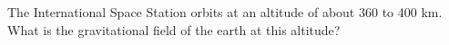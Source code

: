         The International Space Station orbits at an altitude of about 360 to 400 km.
        What is the gravitational field of the earth at this altitude?\answercheck
